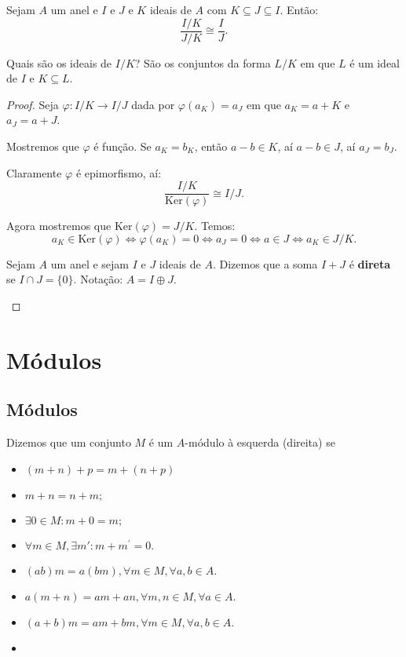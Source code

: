 \documentclass[11pt,twoside,a4paper]{book}
\begin{document}
\begin{corolario}
Sejam $A$ um anel e $I$ e $J$ e $K$ ideais de $A$ com $K\subseteq J\subseteq I$. Então:
\[
\frac{I/K}{J/K}\cong\frac{I}{J}.
\]
\end{corolario}

\begin{observacao}
Quais são os ideais de $I/K$? São os conjuntos da forma $L/K$ em que $L$ é um ideal de $I$ e $K\subseteq L$.
\end{observacao}

\begin{proof}
Seja $\varphi:I/K\rightarrow I/J$ dada por $\varphi(a_K)=a_J$ em que $a_K=a+K$ e $a_J=a+J$.

\medskip
\noindent
Mostremos que $\varphi$ é função. Se $a_K=b_K$, então $a-b\in K$, aí $a-b\in J$, aí $a_J=b_J$.

\medskip
\noindent
Claramente $\varphi$ é epimorfismo, aí:
\[
\frac{I/K}{\mathrm{Ker}(\varphi)}\cong I/J.
\]

\noindent
Agora mostremos que $\mathrm{Ker}(\varphi)=J/K$. Temos:
\[
a_K\in\mathrm{Ker}(\varphi)\Leftrightarrow \varphi(a_K)=0\Leftrightarrow a_J=0\Leftrightarrow a\in J\Leftrightarrow a_K\in J/K.
\]

\begin{definicao}
Sejam $A$ um anel e sejam $I$ e $J$ ideais de $A$. Dizemos que a soma $I+J$ é \textbf{direta} se $I\cap J=\{0\}$. Notação: $A=I\oplus J$.
\end{definicao}

\begin{definicao}

\end{definicao}

\end{proof}

\chapter{Módulos}

\section{Módulos}

\begin{definicao}
Dizemos que um conjunto $M$ é um $A$-módulo à esquerda (direita) se
\begin{itemize}
    \item $(m+n)+p = m+(n+p)$
    \item $m+n = n + m;$
    \item $\exists 0 \in M : m +0 = m;$
    \item $\forall m \in M, \exists m {\prime}: m+m^{\prime} = 0.$
    \item $(ab)m = a(bm), \forall m\in M, \forall a,b \in A.$
    \item $a(m+n) = am+an, \forall m,n\in M, \forall a \in A.$
    \item $(a+b)m = am+bm, \forall m\in M, \forall a,b \in A.$
    \item 
\end{itemize}
\end{definicao}
\end{document}
